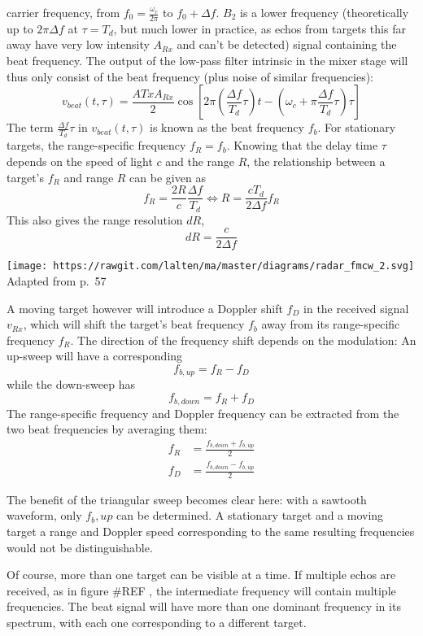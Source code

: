 carrier frequency, from \(f_0 = \frac{\omega_c}{2\pi}\) to
\(f_0 + \Delta f\). \(B_2\) is a lower frequency (theoretically up to
\(2\pi\Delta f\) at \(\tau = T_d\), but much lower in practice, as echos
from targets this far away have very low intensity \(A_{Rx}\) and can't
be detected) signal containing the beat frequency. The output of the
low-pass filter intrinsic in the mixer stage will thus only consist of
the beat frequency (plus noise of similar frequencies): \[
v_{beat}(t,\tau) = \frac{A{Tx}A_{Rx}}{2} \cos \left[ 2\pi\left(\frac{\Delta f}{T_d}\tau\right)t - \left(\omega_c + \pi\frac{\Delta f}{T_d}\tau \right) \tau \right]
\] The term \(\frac{\Delta f}{T_d}\tau\) in \(v_{beat}(t,\tau)\) is
known as the beat frequency \(f_b\). For stationary targets, the
range-specific frequency \(f_R = f_b\). Knowing that the delay time
\(\tau\) depends on the speed of light \(c\) and the range \(R\), the
relationship between a target's \(f_R\) and range \(R\) can be given as
\[
f_R = \frac{2R}{c} \frac{\Delta f}{T_d} \iff R=\frac{c T_d}{2\Delta f}f_R
\] This also gives the range resolution \(dR\), \[
dR = \frac{c}{2 \Delta f}
\]

\texttt{[image: https://rawgit.com/lalten/ma/master/diagrams/radar\_fmcw\_2.svg]}
Adapted from \cite{Adams2012} p.~57

A moving target however will introduce a Doppler shift \(f_D\) in the
received signal \(v_{Rx}\), which will shift the target's beat frequency
\(f_b\) away from its range-specific frequency \(f_R\). The direction of
the frequency shift depends on the modulation: An up-sweep will have a
corresponding \[f_{b,up} = f_R - f_D\] while the down-sweep has
\[f_{b,down} = f_R + f_D\] The range-specific frequency and Doppler
frequency can be extracted from the two beat frequencies by averaging
them: \[
\begin{aligned}
f_R &= \frac{f_{b,down} + f_{b,up}}{2} \\
f_D &= \frac{f_{b,down} - f_{b,up}}{2}
\end{aligned}
\]

The benefit of the triangular sweep becomes clear here: with a sawtooth
waveform, only \(f_b,up\) can be determined. A stationary target and a
moving target a range and Doppler speed corresponding to the same
resulting frequencies would not be distinguishable.

Of course, more than one target can be visible at a time. If multiple
echos are received, as in figure \#REF , the intermediate frequency will
contain multiple frequencies. The beat signal will have more than one
dominant frequency in its spectrum, with each one corresponding to a
different target.

